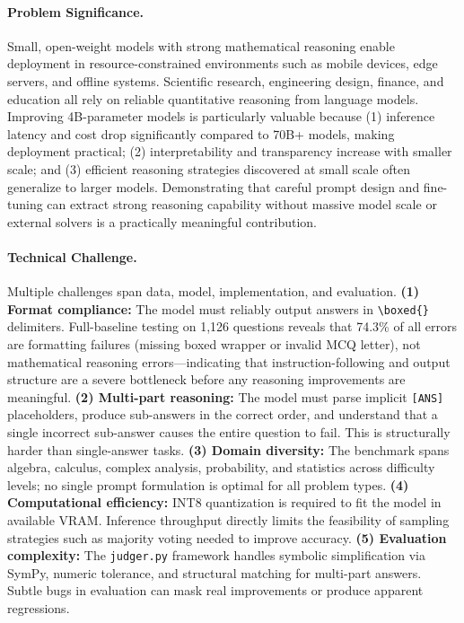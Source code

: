 \documentclass{article}
\begin{document}
\paragraph{Problem Significance.}
Small, open-weight models with strong mathematical reasoning enable deployment in resource-constrained environments such as mobile devices, edge servers, and offline systems. Scientific research, engineering design, finance, and education all rely on reliable quantitative reasoning from language models. Improving 4B-parameter models is particularly valuable because (1) inference latency and cost drop significantly compared to 70B+ models, making deployment practical; (2) interpretability and transparency increase with smaller scale; and (3) efficient reasoning strategies discovered at small scale often generalize to larger models. Demonstrating that careful prompt design and fine-tuning can extract strong reasoning capability without massive model scale or external solvers is a practically meaningful contribution.

\paragraph{Technical Challenge.}
Multiple challenges span data, model, implementation, and evaluation. \textbf{(1) Format compliance:} The model must reliably output answers in \texttt{\textbackslash boxed\{\}} delimiters. Full-baseline testing on 1,126 questions reveals that 74.3\% of all errors are formatting failures (missing boxed wrapper or invalid MCQ letter), not mathematical reasoning errors—indicating that instruction-following and output structure are a severe bottleneck before any reasoning improvements are meaningful. \textbf{(2) Multi-part reasoning:} The model must parse implicit \texttt{[ANS]} placeholders, produce sub-answers in the correct order, and understand that a single incorrect sub-answer causes the entire question to fail. This is structurally harder than single-answer tasks. \textbf{(3) Domain diversity:} The benchmark spans algebra, calculus, complex analysis, probability, and statistics across difficulty levels; no single prompt formulation is optimal for all problem types. \textbf{(4) Computational efficiency:} INT8 quantization is required to fit the model in available VRAM. Inference throughput directly limits the feasibility of sampling strategies such as majority voting needed to improve accuracy. \textbf{(5) Evaluation complexity:} The \texttt{judger.py} framework handles symbolic simplification via SymPy, numeric tolerance, and structural matching for multi-part answers. Subtle bugs in evaluation can mask real improvements or produce apparent regressions.
\end{document}
